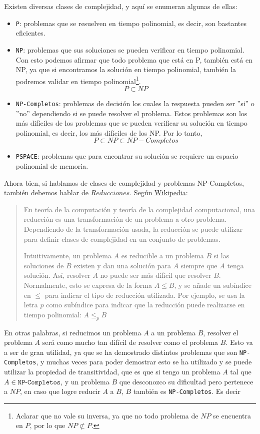 Existen diversas clases de complejidad, y aquí se enumeran algunas de ellas:
\begin{itemize}
	\item \texttt{P}: problemas que se resuelven en tiempo polinomial, es decir, son bastantes eficientes.
	\item \texttt{NP}: problemas que sus soluciones se pueden verificar en tiempo polinomial. Con esto podemos afirmar que todo problema que está en P, también está en NP, ya que si encontramos la solución en tiempo polinomial, también la podremos validar en tiempo polinomial\footnote{Aclarar que no vale su inversa, ya que no todo problema de $NP$ se encuentra en $P$, por lo que $NP \not\subset  P$.}.
    \[ P \subset NP\]
	\item \texttt{NP-Completos}: problemas de decisión los cuales la respuesta pueden ser ''si'' o ''no'' dependiendo si se puede resolver el problema. Estos problemas son los más difíciles de los problemas que se pueden verificar su solución en tiempo polinomial, es decir, los más difíciles de los NP.
    Por lo tanto,
    \[ P \subset NP \subset NP-Completos\]
	\item \texttt{PSPACE}: problemas que para encontrar su solución se requiere un espacio polinomial de memoria.
\end{itemize}
Ahora bien, si hablamos de clases de complejidad y problemas NP-Completos, también debemos hablar de $Reducciones$. Según \href{https://es.wikipedia.org/wiki/Reducci%C3%B3n_(complejidad)}{Wikipedia}:
\begin{quote}
    En teoría de la computación y teoría de la complejidad computacional, una reducción es una transformación de un problema a otro problema. Dependiendo de la transformación usada, la reducción se puede utilizar para definir clases de complejidad en un conjunto de problemas.

    Intuitivamente, un problema $A$ es reducible a un problema $B$ si las soluciones de $B$ existen y dan una solución para $A$ siempre que $A$ tenga solución. Así, resolver $A$ no puede ser más difícil que resolver $B$. Normalmente, esto se expresa de la forma $A \leq B$, y se añade un subíndice en $\le$ para indicar el tipo de reducción utilizada. Por ejemplo, se usa la letra $p$ como subíndice para indicar que la reducción puede realizarse en tiempo polinomial: $A \leq _p B$
\end{quote}

En otras palabras, si reducimos un problema $A$ a un problema $B$, resolver el problema $A$ será como mucho tan difícil de resolver como el problema $B$. Esto va a ser de gran utilidad, ya que se ha demostrado distintos problemas que son \texttt{NP-Completos}, y muchas veces para poder demostrar esto se ha utilizado y se puede utilizar la propiedad de transitividad, que es que si tengo un problema $A$ tal que $A \in \texttt{NP-Completos}$, y un problema $B$ que desconozco su dificultad pero pertenece a $NP$, en caso que logre reducir $A$ a $B$, $B$ también es \texttt{NP-Completos}. Es decir

